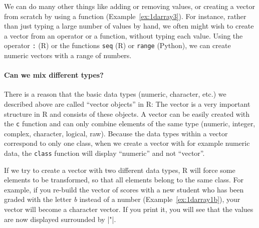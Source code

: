 We can do many other things like adding or removing values, or creating a vector from scratch by using a
function (Example~\ref{ex:1darray3}). For instance, rather than just typing  a large number of values by hand, we often might
wish to create a vector from an operator or a function, without typing
each value. Using the operator \index{:}\texttt{:} (R) or the functions \texttt{seq} (R) or \texttt{range} (Python), we 
can create numeric vectors with
a range of numbers.%



\paragraph[Can we mix different types?]{Can we mix different types?}
There is a reason that the basic data types (numeric, character, etc.) we described above are called
``vector objects'' in R: The vector is a very important structure in
R and consists of these objects. A vector can be easily created with the
\texttt{c} function and can only combine elements of the same type (numeric, integer, complex,
character, logical, raw).
Because the data types within a vector correspond to only one class,
when we create a vector with for example numeric data, the \texttt{class} function will display
``numeric'' and not ``vector''.

If we try to
create a vector with two different data types, R will 
force some elements to be transformed, so that all elements belong to the same
class. For example, if you re-build the vector of scores with a new student who has
been graded with the letter \emph{b} instead of a number (Example~\ref{ex:1darray1b}), your vector
will become a character vector. If you print it, you will see that the
values are now displayed surrounded by |"|.




